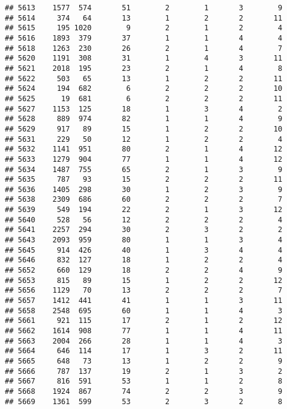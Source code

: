 \documentclass[]{article}
\begin{document}
\begin{verbatim}
## 5613    1577  574       51        2        1       3        9
## 5614     374   64       13        1        2       2       11
## 5615     195 1020        9        2        1       2        4
## 5616    1893  379       37        1        1       4        4
## 5618    1263  230       26        2        1       4        7
## 5620    1191  308       31        1        4       3       11
## 5621    2018  195       23        2        1       4        8
## 5622     503   65       13        1        2       2       11
## 5624     194  682        6        2        2       2       10
## 5625      19  681        6        2        2       2       11
## 5627    1153  125       18        1        3       4        2
## 5628     889  974       82        1        1       4        9
## 5629     917   89       15        1        2       2       10
## 5631     229   50       12        1        2       2        4
## 5632    1141  951       80        2        1       4       12
## 5633    1279  904       77        1        1       4       12
## 5634    1487  755       65        2        1       3        9
## 5635     787   93       15        2        2       2       11
## 5636    1405  298       30        1        2       3        9
## 5638    2309  686       60        2        2       2        7
## 5639     549  194       22        2        1       3       12
## 5640     528   56       12        2        2       2        4
## 5641    2257  294       30        2        3       2        2
## 5643    2093  959       80        1        1       3        4
## 5645     914  426       40        1        3       4        4
## 5646     832  127       18        1        2       2        4
## 5652     660  129       18        2        2       4        9
## 5653     815   89       15        1        2       2       12
## 5656    1129   70       13        2        2       2        7
## 5657    1412  441       41        1        1       3       11
## 5658    2548  695       60        1        1       4        3
## 5661     921  115       17        2        1       2       12
## 5662    1614  908       77        1        1       4       11
## 5663    2004  266       28        1        1       4        3
## 5664     646  114       17        1        3       2       11
## 5665     648   73       13        1        2       2        9
## 5666     787  137       19        2        1       3        2
## 5667     816  591       53        1        1       2        8
## 5668    1924  867       74        2        2       3        9
## 5669    1361  599       53        2        3       2        8

\end{verbatim}
\end{document}
